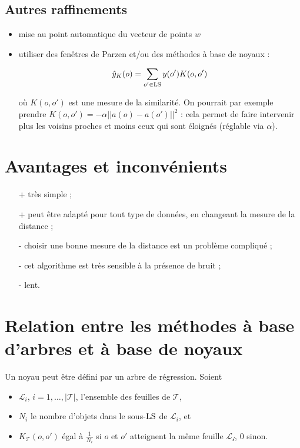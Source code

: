 		
		\subsection{Autres raffinements}
		
		\begin{itemize}
			\item mise au point automatique du vecteur de points $w$
			\item utiliser des fenêtres de Parzen et/ou des méthodes à base de noyaux :
			
			$$\hat{y}_K(o) = \sum_{o' \in \text{LS}} y(o') K(o, o')$$
			
			où $K(o, o')$ est une mesure de la similarité. On pourrait par exemple prendre $K(o, o') = -\alpha \vert \vert a(o) - a(o') \vert \vert^2$ : cela permet de faire intervenir plus les voisins proches et moins ceux qui sont éloignés (réglable via $\alpha$).
		\end{itemize}

	\section{Avantages et inconvénients}
		
	\begin{itemize}
		\item[+] très simple ;
		\item[+] peut être adapté pour tout type de données, en changeant la mesure de la distance ;
		\item[-] choisir une bonne mesure de la distance est un problème compliqué ;
		\item[-] cet algorithme est très sensible à la présence de bruit ;
		\item[-] lent.
	\end{itemize}
	
	
	\section{Relation entre les méthodes à base d'arbres et à base de noyaux}
	
	Un noyau peut être défini par un arbre de régression. Soient
	
	\begin{itemize}
		\item $\mathcal{L}_i$, $i = 1, \dots , \vert \mathcal{T} \vert$, l'ensemble des feuilles de $\mathcal{T}$,
		\item $N_i$ le nombre d'objets dans le sous-$\text{LS}$ de $\mathcal{L}_i$, et
		\item $K_\mathcal{T}(o, o')$ égal à $\frac{1}{N_i}$ si $o$ et $o'$ atteignent la même feuille $\mathcal{L_i}$, 0 sinon.
	\end{itemize}
	
